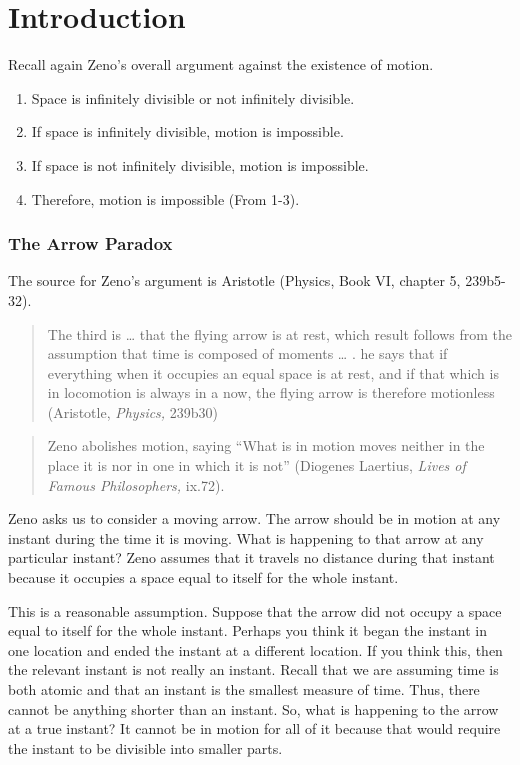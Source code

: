 \documentclass[oneside]{article}
\begin{document}
\thispagestyle{fancy}



\section{Introduction}

Recall again Zeno's overall argument against the existence of motion. 

\begin{enumerate}
\item Space is infinitely divisible or not infinitely divisible.
\item  If space is infinitely divisible, motion is impossible.
\item  If space is not infinitely divisible, motion is impossible.
\item  Therefore, motion is impossible (From 1-3).
\end{enumerate}


\subsubsection{The Arrow Paradox}\label{the-arrow-paradox}

The source for Zeno's argument is Aristotle (Physics, Book VI, chapter 5, 239b5-32).

\begin{quote}
The third is \ldots{} that the flying arrow is at rest, which result
follows from the assumption that time is composed of moments \ldots{} .
he says that if everything when it occupies an equal space is at rest,
and if that which is in locomotion is always in a now, the flying arrow
is therefore motionless (Aristotle, \emph{Physics,} 239b30)
\end{quote}

\begin{quote}
Zeno abolishes motion, saying ``What is in motion moves neither in the
place it is nor in one in which it is not'' (Diogenes Laertius, \emph{Lives of
Famous Philosophers,} ix.72).
\end{quote}

Zeno asks us to consider a moving arrow. The arrow should be in motion at any instant during the time it is moving. What is happening to that arrow at any particular instant? Zeno assumes that it travels no distance during that instant because it occupies a space equal to itself  for the whole instant. 

This is a reasonable assumption. Suppose that the arrow did not occupy a space equal to itself for the whole instant. Perhaps you think it began the instant in one location and ended the instant at a different location. If you think this, then the relevant instant is not really an instant. Recall that we are assuming time is both atomic and that an instant is the smallest measure of time. Thus, there cannot be anything shorter than an instant. So, what is happening to the arrow at a true instant? It cannot be in motion for all of it because that would require the instant to be divisible into smaller parts.   
\end{document}
